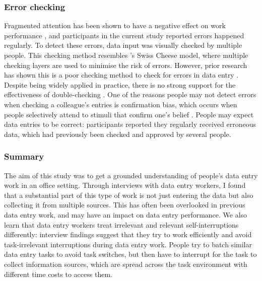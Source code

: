 \subsubsection{Error checking}
Fragmented attention has been shown to have a negative effect on work performance \citep{Bailey2001, Carrier2015}, and participants in the current study reported errors happened regularly. To detect these errors, data input was visually checked by multiple people. This checking method resembles \citeauthor{Reason1990}'s \citeyearpar{Reason1990}  Swiss Cheese model, where multiple checking layers are used to minimise the risk of errors. However, prior research has shown this is a poor checking method to check for errors in data entry \citep{Olsen2008, Wiseman2013a}. Despite being widely applied in practice, there is no strong support for the effectiveness of double-checking \citep{Li2016}. One of the reasons people may not detect errors when checking a colleague's entries is confirmation bias, which occurs when people selectively attend to stimuli that confirm one's belief \citep{Lewis1986}. People may expect data entries to be correct: participants reported they regularly received erroneous data, which had previously been checked and approved by several people. 


\subsubsection{Summary}
The aim of this study was to get a grounded understanding of people's data entry work in an office setting. Through interviews with data entry workers, I found that a substantial part of this type of work is not just entering the data but also collecting it from multiple sources. This has often been overlooked in previous data entry work, and may have an impact on data entry performance. We also learn that data entry workers treat irrelevant and relevant self-interruptions differently: interview findings suggest that they try to work efficiently and avoid task-irrelevant interruptions during data entry work. People try to batch similar data entry tasks to avoid task switches, but then have to interrupt for the task to collect information sources, which are spread across the task environment with different time costs to access them. 

